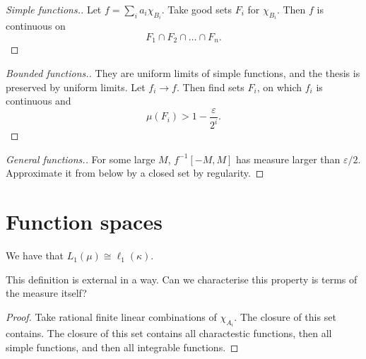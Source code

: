 \begin{proof}[Simple functions.]
    Let \( f = \sum_i a_i \chi_{B_i} \). Take good sets \( F_i \) for \( \chi_{B_i} \). Then \( f \) is continuous on
    \[ 
       F_1 \cap F_2 \cap \ldots \cap F_n. 
   \]
\end{proof}

\begin{proof}[Bounded functions.]
    They are uniform limits of simple functions, and the thesis is preserved by uniform limits. Let \( f_i \to f \). Then find sets \( F_i \), on which \( f_i \) is continuous and
    \[ 
       \mu(F_i) > 1 - \frac{\varepsilon }{2^i}. 
   \]
\end{proof}

\begin{proof}[General functions.]
    For some large \( M \), \( f^{-1}[-M, M] \) has measure larger than \(\varepsilon/2 \). Approximate it from below by a closed set by regularity.
\end{proof}

\section*{Function spaces}

We have that \( L_1(\mu) \cong \ell_1(\kappa) \).


This definition is external in a way. Can we characterise this property is terms of the measure itself?


\begin{proof} Take rational finite linear combinations of \( \chi_{A_i} \). The closure of this set contains. The closure of this set contains all charactestic functions, then all simple functions, and then all integrable functions.
\end{proof}

